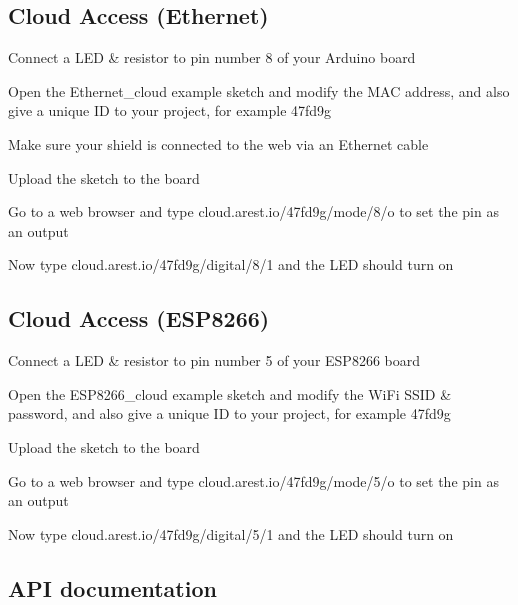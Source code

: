 \subsection*{Cloud Access (Ethernet)}


\begin{DoxyEnumerate}
\item Connect a L\+ED \& resistor to pin number 8 of your Arduino board
\item Open the Ethernet\+\_\+cloud example sketch and modify the M\+AC address, and also give a unique ID to your project, for example 47fd9g
\item Make sure your shield is connected to the web via an Ethernet cable
\end{DoxyEnumerate}
\begin{DoxyEnumerate}
\item Upload the sketch to the board
\item Go to a web browser and type {\ttfamily cloud.\+arest.\+io/47fd9g/mode/8/o} to set the pin as an output
\item Now type {\ttfamily cloud.\+arest.\+io/47fd9g/digital/8/1} and the L\+ED should turn on
\end{DoxyEnumerate}

\subsection*{Cloud Access (E\+S\+P8266)}


\begin{DoxyEnumerate}
\item Connect a L\+ED \& resistor to pin number 5 of your E\+S\+P8266 board
\item Open the E\+S\+P8266\+\_\+cloud example sketch and modify the Wi\+Fi S\+S\+ID \& password, and also give a unique ID to your project, for example 47fd9g
\item Upload the sketch to the board
\item Go to a web browser and type {\ttfamily cloud.\+arest.\+io/47fd9g/mode/5/o} to set the pin as an output
\item Now type {\ttfamily cloud.\+arest.\+io/47fd9g/digital/5/1} and the L\+ED should turn on
\end{DoxyEnumerate}

\subsection*{A\+PI documentation}

